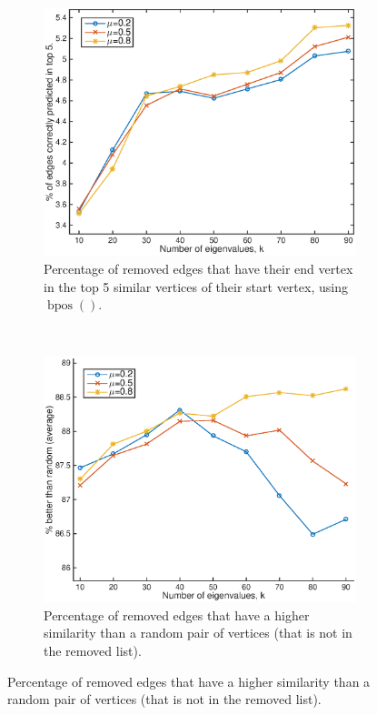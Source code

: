 \documentclass[12pt]{report}
\DeclareMathOperator{\bpos}{bpos}
\begin{document}
\begin{figure}[tpb]
  \centering
  \begin{subfigure}[b]{0.5\textwidth}
    \includegraphics[width=\textwidth]{fb_eig_top5}
		\caption{Percentage of removed edges that have their end vertex in the top
    5 similar vertices of their start vertex, using $\bpos()$.}
    \label{fig:fb_eig_top5}
  \end{subfigure}%
  ~
  \begin{subfigure}[b]{0.5\textwidth}
    \includegraphics[width=\textwidth]{fb_eig_better}
		\caption{Percentage of removed edges that have a higher similarity
    than a random pair of vertices (that is not in the removed list).}

\end{subfigure}
\end{figure}
\end{document}
